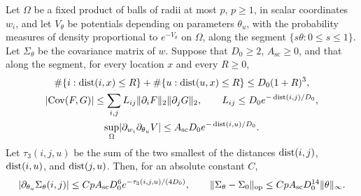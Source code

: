 \begin{lemma}\label{ch10:lem:three-point-covariance}
Let $\Omega$ be a fixed product of balls of radii at most $p$, $p\ge1$, in scalar coordinates $w_i$, and let $V_\theta$ be potentials depending on parameters $\theta_u$, with the probability measures of density proportional to $e^{-V_\theta}$ on $\Omega$, along the segment $\{s\theta:0\le s\le1\}$. Let $\Sigma_\theta$ be the covariance matrix of $w$. Suppose that $D_0\ge2$, $A_{\mathrm{sc}}\ge0$, and that along the segment, for every location $x$ and every $R\ge0$,
\[
 \begin{gathered}
 \#\{i:\operatorname{dist}(i,x)\le R\}+\#\{u:\operatorname{dist}(u,x)\le R\}\le D_0(1+R)^3,\\
 \lvert \operatorname{Cov}(F,G)\rvert\le\sum_{i,j}L_{ij}\lVert \partial_iF\rVert_2\lVert \partial_jG\rVert_2,\qquad L_{ij}\le D_0e^{-\operatorname{dist}(i,j)/D_0},\\
 \sup_\Omega\lvert \partial_{w_i}\partial_{\theta_u}V\rvert\le A_{\mathrm{sc}}D_0e^{-\operatorname{dist}(i,u)/D_0}.
 \end{gathered}
\]
Let $\tau_3(i,j,u)$ be the sum of the two smallest of the distances $\operatorname{dist}(i,j)$, $\operatorname{dist}(i,u)$, and $\operatorname{dist}(j,u)$. Then, for an absolute constant $C$,
\[
 \lvert \partial_{\theta_u}\Sigma_\theta(i,j)\rvert\le CpA_{\mathrm{sc}}D_0^6e^{-\tau_3(i,j,u)/(4D_0)},\qquad
 \lVert \Sigma_\theta-\Sigma_0\rVert_{\mathrm{op}}\le CpA_{\mathrm{sc}}D_0^{14}\lVert \theta\rVert_\infty.
\]
\end{lemma}

